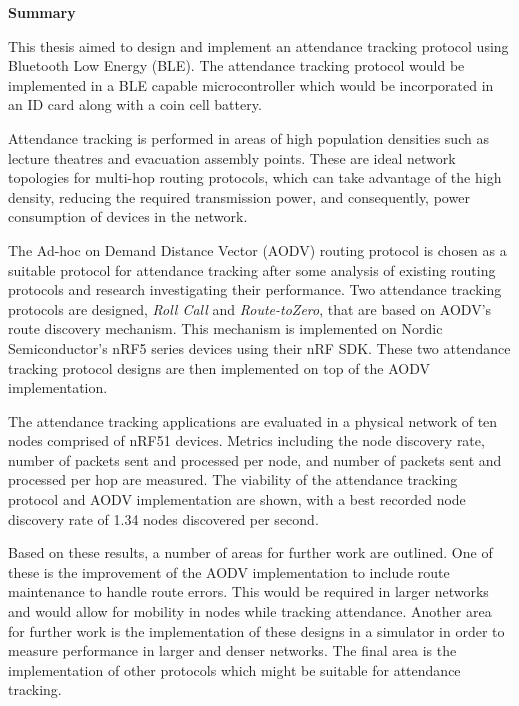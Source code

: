 \begin{center}
  \textbf{\LARGE{Summary}}
\end{center}

This thesis aimed to design and implement an attendance tracking protocol
using Bluetooth Low Energy (BLE). The attendance tracking protocol would be implemented
in a BLE capable microcontroller which would be incorporated in an ID card along with
a coin cell battery.

Attendance tracking is performed in areas of high population densities such as
lecture theatres and evacuation assembly points. These are ideal network topologies for multi-hop
routing protocols, which can take advantage of the high density, reducing the required transmission
power, and consequently, power consumption of devices in the network.

The Ad-hoc on Demand Distance Vector (AODV) routing protocol is
chosen as a suitable protocol for attendance tracking after some analysis of existing
routing protocols and research investigating their performance. Two attendance tracking
protocols are designed, \textit{Roll Call} and \textit{Route-toZero}, that are based on AODV's route discovery mechanism.
This mechanism is implemented on Nordic Semiconductor's nRF5 series devices
using their nRF SDK. These two attendance tracking protocol designs are then implemented
on top of the AODV implementation.

The attendance tracking applications are evaluated in a physical network of ten nodes
comprised of nRF51 devices. Metrics including the node discovery rate, number of
packets sent and processed per node, and number of packets sent and processed per hop
are measured. The viability of the attendance tracking protocol
and AODV implementation are shown, with a best recorded node discovery rate of 1.34
nodes discovered per second.

Based on these results, a number of areas for further work are outlined. One of
these is the improvement of the AODV implementation to include route maintenance
to handle route errors. This would be required in larger networks and would
allow for mobility in nodes while tracking attendance. Another area for further work
is the implementation of these designs in a simulator in order to measure performance in larger
and denser networks. The final area is the implementation of other protocols which might
be suitable for attendance tracking.

\newpage
